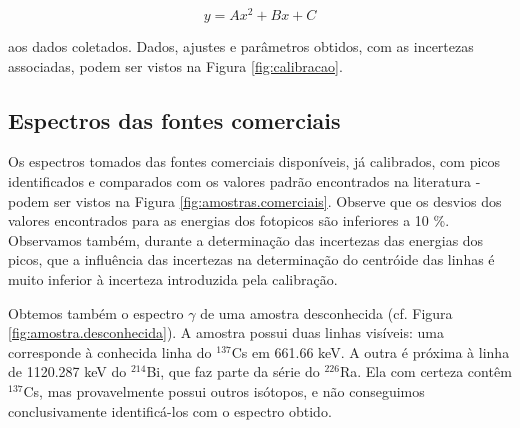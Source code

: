\documentclass[a4paper, 11pt, notitlepage]{article}
\numberwithin{equation}{section}  %
\begin{document}
$$ y= Ax^2 + Bx + C $$

\noindent aos dados coletados. Dados, ajustes e parâmetros obtidos, com as incertezas associadas, podem ser vistos na Figura \ref{fig:calibracao}.

\subsection{Espectros das fontes comerciais}

Os espectros tomados das fontes comerciais disponíveis, já calibrados, com picos identificados e comparados com os valores padrão encontrados na literatura \cite{TabRad_v1}-\cite{TabRad_v8} podem ser vistos na Figura \ref{fig:amostras.comerciais}. Observe que os desvios dos valores encontrados para as energias dos fotopicos são inferiores a 10 \%. Observamos também, durante a determinação das incertezas das energias dos picos, que a influência das incertezas na determinação do centróide das linhas é muito inferior à incerteza introduzida pela calibração.

Obtemos também o espectro $\gamma$ de uma amostra desconhecida (cf. Figura \ref{fig:amostra.desconhecida}). A amostra possui duas linhas visíveis: uma corresponde à conhecida linha do ${}^{137}$Cs em 661.66 keV. A outra é próxima à linha de 1120.287 keV do ${}^{214}$Bi, que faz parte da série do ${}^{226}$Ra. Ela com certeza contêm ${}^{137}$Cs, mas provavelmente possui outros isótopos, e não conseguimos conclusivamente identificá-los com o espectro obtido.
\end{document}
